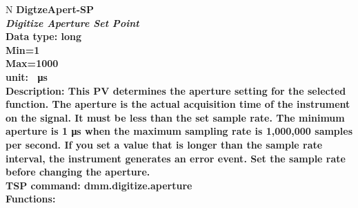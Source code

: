 \documentclass[openany]{article}
\begin{document}
		\begin{tabular}{N}
			\hline
			\bfseries DigtzeApert-SP\label{pv:digtzeapert-sp} \\ \hline
			\emph{Digitize Aperture Set Point} \\
			Data type: long \\
			Min=1 \\
			Max=1000 \\
			unit: \SI{}{\micro\second} \\
			Description: This PV determines the aperture setting for the selected function. The aperture is the actual acquisition time of the instrument on the signal. It must be less than the set sample rate. The minimum aperture is 1 μs when the maximum sampling rate is 1,000,000 samples per second. If you set a value that is longer than the sample rate interval, the instrument generates an error event. Set the sample rate before changing the aperture. \\
			TSP command: dmm.digitize.aperture \\
			Functions: \\
			\arrayrulecolor{\FuncTableBorderColor}

		\end{tabular}
\end{document}
